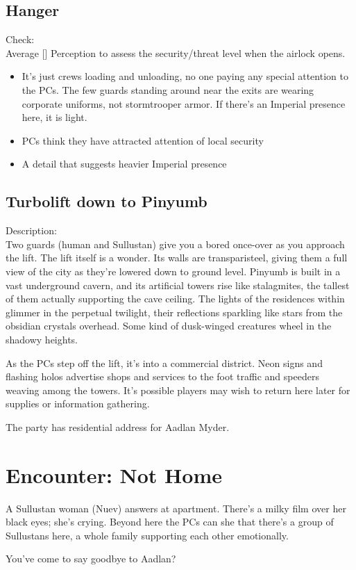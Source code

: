 \documentclass{book}
\newcommand{\df}{\difficulty}
\begin{document}
\begin{multicols}{2}
\subsection{Hanger}
Check:\\
Average [\df\df] Perception to assess the security/threat level when the airlock opens.
\begin{itemize}
    \item \success It’s just crews loading and unloading, no one paying any special attention to the PCs. The few guards standing around near the exits are wearing corporate uniforms, not stormtrooper armor. If there’s an Imperial presence here, it is light.
    \item \failure PCs think they have attracted attention of local security
    \item \threat A detail that suggests heavier Imperial presence
\end{itemize}

\subsection{Turbolift down to Pinyumb}
Description:\\
Two guards (human and Sullustan) give you a bored once-over as you approach the lift. The lift itself is a wonder. Its walls are transparisteel, giving them a full view of the city as they’re lowered down to ground level. Pinyumb is built in a vast underground cavern, and its artificial towers rise like stalagmites, the tallest of them actually supporting the cave ceiling. The lights of the residences within glimmer in the perpetual twilight, their reflections sparkling like stars from the obsidian crystals overhead. Some kind of dusk-winged creatures wheel in the shadowy heights.

As the PCs step off the lift, it’s into a commercial district. Neon signs and flashing holos advertise shops and services to the foot traffic and speeders weaving among the towers. It's possible players may wish to return here later for supplies or information gathering.

The party has residential address for Aadlan Myder.

\section{Encounter: Not Home}

A Sullustan woman (Nuev) answers at apartment. There’s a milky film over her black eyes; she’s crying. Beyond here the PCs can she that there’s a group of Sullustans here, a whole family supporting each other emotionally. 
\begin{quoting}
You’ve come to say goodbye to Aadlan? 
\end{quoting}


\end{multicols}
\end{document}
